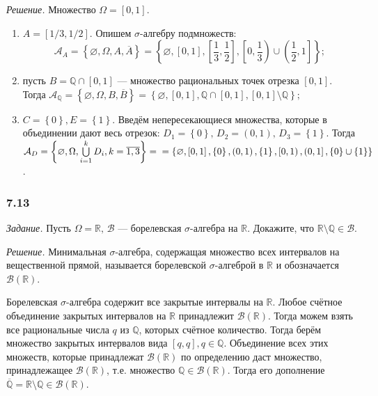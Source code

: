 \textit{Решение.} Множество $ \Omega = \left[ 0, 1 \right] $.

\begin{enumerate}[label=\alph*)]
\item $A = \left[ 1/3, 1/2 \right] $.
Опишем $ \sigma $-алгебру подмножеств:
$$ \mathcal{A}_A =
\left\{ \varnothing, \Omega, A, \overline{A} \right\} =
\left\{ \varnothing, \left[ 0, 1 \right],
\left[ \frac{1}{3}, \frac{1}{2} \right], \left[ 0, \frac{1}{3} \right) \cup \left( \frac{1}{2}, 1 \right] \right\};$$
\item пусть $B = \mathbb{Q} \cap \left[ 0, 1 \right] $ --- множество рациональных точек отрезка $ \left[ 0, 1 \right] $.
Тогда
$ \mathcal{A}_{ \mathbb{Q} } =
\left\{ \varnothing, \Omega, B, \overline{B} \right\} =
\left\{ \varnothing, \left[ 0, 1 \right], \mathbb{Q} \cap \left[ 0, 1 \right], \left[ 0, 1 \right] \setminus \mathbb{Q} \right\};$
\item $C = \left\{ 0 \right\}, E = \left\{ 1 \right\} $.
Введём непересекающиеся множества,
которые в объединении дают весь отрезок: $D_1 = \left\{ 0 \right\}, \, D_2 = \left( 0, 1 \right), \, D_3 = \left\{ 1 \right\} $.
Тогда
$ \mathcal{A}_D =
\left\{ \varnothing, \Omega, \bigcup \limits_{i=1}^k D_i, k = \overline{1, 3} \right\} = \\
= \left\{ \varnothing, \left[0, 1 \right], \left\{ 0 \right\}, \left( 0, 1 \right),
\left\{ 1 \right\}, \left[0, 1 \right), \left(0, 1 \right], \left\{ 0 \right\} \cup \left\{ 1 \right\} \right\} $.
\end{enumerate}

\subsubsection*{7.13}

\textit{Задание.} Пусть $ \Omega = \mathbb{R}, \, \mathcal{B} $ --- борелевская $ \sigma $-алгебра на $ \mathbb{R} $.
Докажите, что $ \mathbb{R} \setminus \mathbb{Q} \in \mathcal{B} $.

\textit{Решение.} Минимальная $ \sigma $-алгебра,
содержащая множество всех интервалов на вещественной прямой,
называется борелевской $ \sigma $-алгеброй в $ \mathbb{R} $ и обозначается $ \mathcal{B} \left( \mathbb{R} \right) $.

Борелевская $ \sigma $-алгебра содержит все закрытые интервалы на $ \mathbb{R} $.
Любое счётное объединение закрытых интервалов на $ \mathbb{R} $ принадлежит $ \mathcal{B} \left( \mathbb{R} \right) $.
Тогда можем взять все рациональные числа $q$ из $ \mathbb{Q} $, которых счётное количество.
Тогда берём множество закрытых интервалов вида $ \left[ q, q \right], q \in \mathbb{Q} $.
Объединение всех этих множеств,
которые принадлежат $ \mathcal{B} \left( \mathbb{R} \right) $ по определению даст множество,
принадлежащее $ \mathcal{B} \left( \mathbb{R} \right) $, т.е. множество $ \mathbb{Q} \in \mathcal{B} \left( \mathbb{R} \right) $.
Тогда его дополнение $ \overline{ \mathbb{Q} } = \mathbb{R} \setminus \mathbb{Q} \in \mathcal{B} \left( \mathbb{R} \right) $.
